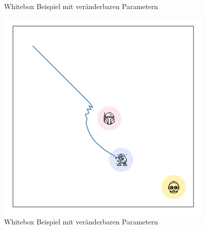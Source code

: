 \begin{figure}[ht!]
  \centering
  \caption{Whitebox Beispiel mit veränderbaren Parametern}
  \label{fig:whitebox}
\end{figure}

\begin{figure}[ht!]
  \centering
  \includegraphics[width=0.7\linewidth, height=0.7\linewidth]{img/sim1.png}
  \caption{Whitebox Beispiel mit veränderbaren Parametern}
  \label{fig:whitebox}
\end{figure}

